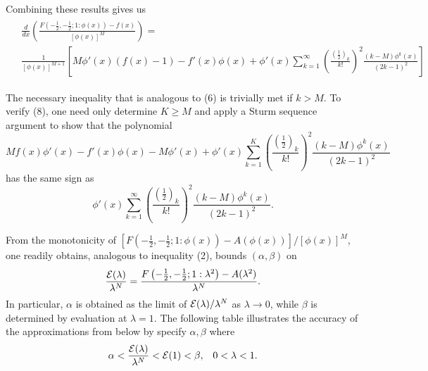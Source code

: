 \documentclass[12pt]{article}
\begin{document}
 \noindent  Combining these results gives us 
\begin{align*}
\begin{split} 
&  \frac{d}{dx} (\frac{F(-\frac{1}{2}, -\frac{1}{2}; 
1:\phi(x))-f(x)}{[\phi(x)]^M}) = 
\\[4ex] 
 &  \frac{1}{[\phi(x)]^{M+1}} \left[ M\phi'(x)(f(x)-1)- f'(x)\phi(x) 
  + 
\phi'(x) \sum_{k=1}^{\infty} \left(\frac{(\frac{1}{2})_k}{k!}\right)^2 
\frac{(k-M)\phi^k(x)}{(2k-1)^2}  \right]
\end{split}
\end{align*} 

The  necessary inequality that is analogous to (6) is trivially met if 
$k>M$. To verify (8), one 
need only determine $K \geq M$ and apply a Sturm sequence argument to 
show that the polynomial 
$$
Mf(x)\phi'(x)-f'(x)\phi(x) -M\phi'(x) + \phi'(x) \sum_{k=1}^{K}
\left(\frac{(\frac{1}{2})_k}{k!}\right)^2 
\frac{(k-M)\phi^k(x)}{(2k-1)^2} 
$$
has the same sign as 
$$
\phi'(x) \sum_{k=1}^{\infty} \left(\frac{(\frac{1}{2})_k}{k!}\right)^2 
\frac{(k-M)\phi^k(x)}{(2k-1)^2}.  
$$  

From the monotonicity of  $  \left[ 
F\left(-\frac{1}{2},-\frac{1}{2};1:\phi(x)\right)
-  A(\phi(x))\right]/[\phi(x)]^M$, one readily obtains, analogous to 
inequality (2),  bounds
$(\alpha, \beta)$ on 
$$ 
\frac{{\cal E}(\lambda)}{\lambda^N}= 
\frac{F\left(-\frac{1}{2},-\frac{1}{2};1:\lambda^2\right)
-  A(\lambda^2)}{\lambda^N}. 
$$ 
In particular, $\alpha$ is obtained as the limit of ${\cal 
E}(\lambda)/\lambda^N$
as $\lambda \rightarrow 0$, while
$\beta$ is determined by evaluation at $\lambda=1$.
The following table illustrates the accuracy of the  approximations from 
below by specify $\alpha,
\beta$ where
\begin{equation}
\alpha < \frac{{\cal E}(\lambda)}{\lambda^N} < {\cal E}(1) <  \beta, 
\;\;\; 0<\lambda<1.
\end{equation}
\end{document}
